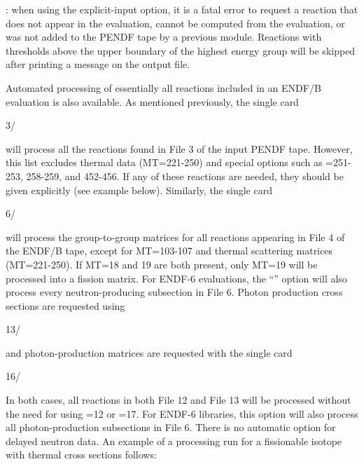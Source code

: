 : when using the explicit-input option, it is a fatal
error to request a reaction that does not appear in the evaluation,
cannot be computed from the evaluation, or was not added to the
PENDF tape by a previous module.  Reactions with thresholds above
the upper boundary of the highest energy group will be skipped after
printing a message on the output file.

Automated processing of essentially all reactions included in an ENDF/B
evaluation is also available.  As mentioned previously, the single card

\small
\begin{ccode}

   3/

\end{ccode}
\normalsize

\noindent
will process all the reactions found in File 3 of the input PENDF tape.
However, this list excludes thermal data (MT=221-250) and special
options such as =251-253, 258-259, and 452-456.  If any of these
reactions are needed, they should be given explicitly (see example below).
Similarly, the single card

\small
\begin{ccode}

   6/

\end{ccode}
\normalsize


\noindent
will process the group-to-group matrices for all reactions appearing in
File 4 of the ENDF/B tape, except for MT=103-107 and thermal scattering
matrices (MT=221-250).  If MT=18 and 19 are both present, only MT=19
will be processed into a fission matrix.  For ENDF-6 evaluations, the
``'' option will also process every neutron-producing subsection in
File 6.  Photon production cross sections are requested using

\small
\begin{ccode}

   13/

\end{ccode}
\normalsize

\noindent
and photon-production matrices are requested with the single card

\small
\begin{ccode}

   16/

\end{ccode}
\normalsize

\noindent
In both cases, all reactions in both File 12 and File 13 will be processed
without the need for using =12 or =17.  For ENDF-6
libraries, this option will also process all photon-production subsections
in File 6.  There is no automatic option for delayed neutron data.  An
example of a processing run for a fissionable isotope with thermal
cross sections follows:

